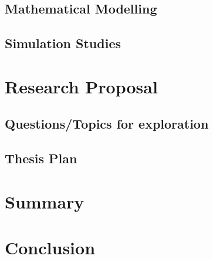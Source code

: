 \documentclass[department=ai,degree=phd,book=proposal,backref=page,spacing=single]{common/iiththesis}
\begin{document}
\hypertarget{mathematical-modelling}{%
\subsection{Mathematical Modelling}\label{mathematical-modelling}}

\hypertarget{simulation-studies}{%
\subsection{Simulation Studies}\label{simulation-studies}}

\newpage{}

\hypertarget{research-proposal}{%
\section*{Research Proposal}\label{research-proposal}}

\hypertarget{questionstopics-for-exploration}{%
\subsection{Questions/Topics for
exploration}\label{questionstopics-for-exploration}}

\hypertarget{thesis-plan}{%
\subsection{Thesis Plan}\label{thesis-plan}}

\newpage{}

\hypertarget{summary}{%
\section*{Summary}\label{summary}}

\newpage{}

\hypertarget{conclusion}{%
\section*{Conclusion}\label{conclusion}}

\newpage{}
\clearpage
\newpage
\printbibliography[title={References}]
\end{document}
